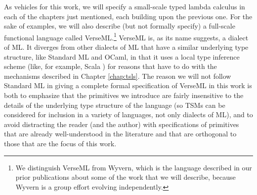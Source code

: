 As vehicles for this work, we will specify a small-scale typed lambda calculus in each of the chapters just mentioned, each building upon the previous one. For the sake of examples, we will also describe (but not formally specify) a full-scale functional language called VerseML.\footnote{We distinguish VerseML from Wyvern, which is the language described in our prior publications about some of the work that we will describe, because Wyvern is a group effort evolving independently.} VerseML is, as its name suggests, a dialect of ML. It diverges from other dialects of ML that have a similar underlying type structure, like Standard ML and OCaml, in that it uses a local type inference scheme \cite{Pierce:2000:LTI:345099.345100} (like, for example, Scala \cite{OdeZenZen01}) for reasons that have to do with the mechanisms described in Chapter \ref{chap:tsls}. The reason we will not follow Standard ML \cite{mthm97-for-dart} in giving a complete formal specification of VerseML in this work is both to emphasize that the primitives we introduce are fairly insensitive to the details of the underlying type structure of the language (so TSMs can be considered for inclusion in a variety of languages, not only dialects of ML), and to avoid distracting the reader (and the author) with specifications of primitives that are already well-understood in the literature and that are orthogonal to those that are the focus of this work. %



